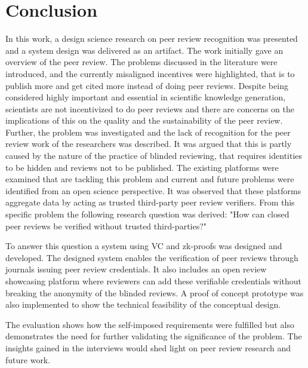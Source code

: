 
\chapter{Conclusion}\label{chapter:conclusion}

In this work, a design science research on peer review recognition was presented and a system design was delivered as an artifact. The work initially gave an overview of the peer review. The problems discussed in the literature were introduced, and the currently misaligned incentives were highlighted, that is to publish more and get cited more instead of doing peer reviews. Despite being considered highly important and essential in scientific knowledge generation, scientists are not incentivized to do peer reviews and there are concerns on the implications of this on the quality and the sustainability of the peer review. Further, the problem was investigated and the lack of recognition for the peer review work of the researchers was described. It was argued that this is partly caused by the nature of the practice of blinded reviewing, that requires identities to be hidden and reviews not to be published. The existing platforms were examined that are tackling this problem and current and future problems were identified from an open science perspective. It was observed that these platforms aggregate data by acting as trusted third-party peer review verifiers. From this specific problem the following research question was derived: "How can closed peer reviews be verified without trusted third-parties?"

To answer this question a system using \acrlong{VC} and \acrlong{zk-proofs} was designed and developed. The designed system enables the verification of peer reviews through journals issuing peer review credentials. It also includes an open review showcasing platform where reviewers can add these verifiable credentials without breaking the anonymity of the blinded reviews. A proof of concept prototype was also implemented to show the technical feasibility of the conceptual design.

The evaluation shows how the self-imposed requirements were fulfilled but also demonstrates the need for further validating the significance of the problem. The insights gained in the interviews would shed light on peer review research and future work. 


